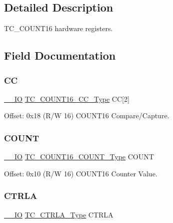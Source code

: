\subsection{Detailed Description}
T\+C\+\_\+\+C\+O\+U\+N\+T16 hardware registers. 

\subsection{Field Documentation}
\mbox{\label{struct_tc_count16_abc511320182a4cd1411b852c5ea54c56}} 
\subsubsection{\texorpdfstring{CC}{CC}}
{\footnotesize\ttfamily \mbox{\hyperlink{core__cm0plus_8h_aec43007d9998a0a0e01faede4133d6be}{\+\_\+\+\_\+\+IO}} \mbox{\hyperlink{union_t_c___c_o_u_n_t16___c_c___type}{T\+C\+\_\+\+C\+O\+U\+N\+T16\+\_\+\+C\+C\+\_\+\+Type}} CC\mbox{[}2\mbox{]}}



Offset\+: 0x18 (R/W 16) C\+O\+U\+N\+T16 Compare/\+Capture. 

\mbox{\label{struct_tc_count16_aaec7f831601ba8c34e6e77e8b7503300}} 
\subsubsection{\texorpdfstring{COUNT}{COUNT}}
{\footnotesize\ttfamily \mbox{\hyperlink{core__cm0plus_8h_aec43007d9998a0a0e01faede4133d6be}{\+\_\+\+\_\+\+IO}} \mbox{\hyperlink{union_t_c___c_o_u_n_t16___c_o_u_n_t___type}{T\+C\+\_\+\+C\+O\+U\+N\+T16\+\_\+\+C\+O\+U\+N\+T\+\_\+\+Type}} C\+O\+U\+NT}



Offset\+: 0x10 (R/W 16) C\+O\+U\+N\+T16 Counter Value. 

\mbox{\label{struct_tc_count16_a282ae6be6071506774ed492a00c9a7c5}} 
\subsubsection{\texorpdfstring{CTRLA}{CTRLA}}
{\footnotesize\ttfamily \mbox{\hyperlink{core__cm0plus_8h_aec43007d9998a0a0e01faede4133d6be}{\+\_\+\+\_\+\+IO}} \mbox{\hyperlink{union_t_c___c_t_r_l_a___type}{T\+C\+\_\+\+C\+T\+R\+L\+A\+\_\+\+Type}} C\+T\+R\+LA}



